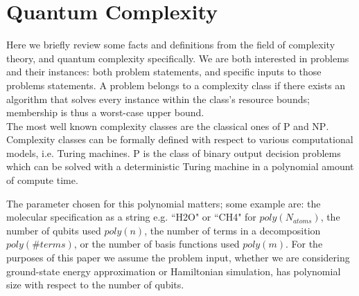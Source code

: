 \documentclass[%
 aip,
 amsmath,amssymb,
 reprint,%
]{revtex4-1}
\newcommand{\note}[1]{ {\color{purple} #1}}
\begin{document}
\appendix 
\section{Quantum Complexity} \label{app:qcomp}

\indent %
Here we briefly review some facts and definitions from the field of complexity theory, and quantum complexity specifically. We are both interested in problems and their instances: both problem statements, and specific inputs to those problems statements. A problem belongs to a complexity class if there exists an algorithm that solves every instance within the class's resource bounds; membership is thus a worst-case upper bound. \\ 
\indent The { most well known complexity classes} are the classical ones of $\mathrm{P}$ and $\mathrm{NP}$. Complexity classes can be formally defined with respect to various computational models, i.e. Turing machines. $\mathrm{P}$ is the class of binary output decision problems which can be solved with a deterministic Turing machine in a polynomial amount of compute time. 

The parameter chosen for this polynomial matters; some example are: the molecular specification as a string e.g. ``H2O" or ``CH4" for $poly(N_{atoms})$, the number of qubits used $poly(n)$, the number of terms in a decomposition $poly(\#  terms)$, or the number of basis functions used $poly(m)$. 
For the purposes of this paper we assume the problem input, whether we are considering ground-state energy approximation or Hamiltonian simulation, has polynomial size with respect to the number of qubits.

\end{document}
